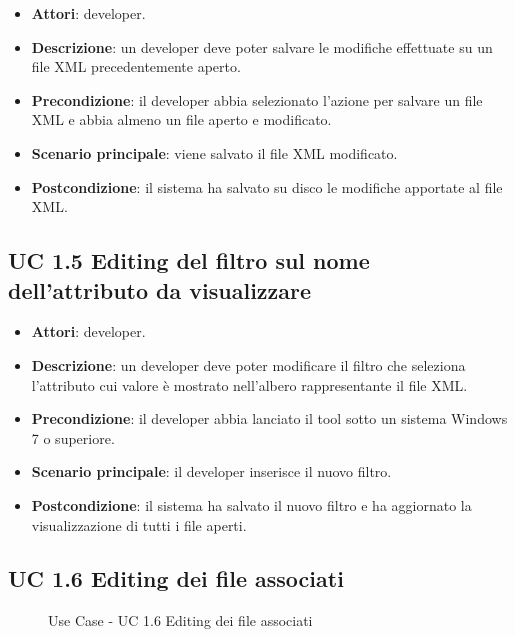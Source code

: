 		\begin{itemize}
			\item\textbf{Attori}: developer.
			\item\textbf{Descrizione}: un developer deve poter salvare le modifiche effettuate su un file XML precedentemente aperto.
			\item\textbf{Precondizione}: il developer abbia selezionato l'azione per salvare un file XML e abbia almeno un file aperto e modificato.
			\item\textbf{Scenario principale}: viene salvato il file XML modificato.
			\item\textbf{Postcondizione}: il sistema ha salvato su disco le modifiche apportate al file XML.
		\end{itemize}
		
	\subsection{UC 1.5 Editing del filtro sul nome dell'attributo da visualizzare}
		\label{subsec:XEUC1.5}
		
		\begin{itemize}
			\item\textbf{Attori}: developer.
			\item\textbf{Descrizione}: un developer deve poter modificare il filtro che seleziona l'attributo cui valore è mostrato nell'albero rappresentante il file XML.
			\item\textbf{Precondizione}: il developer abbia lanciato il tool sotto un sistema Windows 7 o superiore.
			\item\textbf{Scenario principale}: il developer inserisce il nuovo filtro.
			\item\textbf{Postcondizione}: il sistema ha salvato il nuovo filtro e ha aggiornato la visualizzazione di tutti i file aperti.
		\end{itemize}
		
	\subsection{UC 1.6 Editing dei file associati}
		\label{subsec:XEUC1.6}
		
		\begin{figure}[!h] 
			\centering 
			\caption{Use Case - UC 1.6 Editing dei file associati}
		\end{figure}
		

